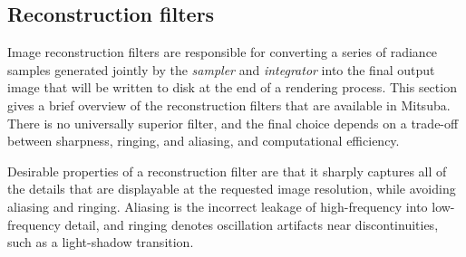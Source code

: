\newpage
\subsection{Reconstruction filters}
\label{sec:rfilters}
Image reconstruction filters are responsible for converting a series of radiance samples generated
jointly by the \emph{sampler} and \emph{integrator} into the final output image that will be written
to disk at the end of a rendering process.
This section gives a brief overview of the reconstruction filters that are available in Mitsuba.
There is no universally superior filter, and the final choice depends on a trade-off between
sharpness, ringing, and aliasing, and computational efficiency.

Desirable properties of a reconstruction filter are that it sharply captures all of the details that
are displayable at the requested image resolution, while avoiding aliasing and ringing. Aliasing is
the incorrect leakage of high-frequency into low-frequency detail, and ringing denotes oscillation artifacts
near discontinuities, such as a light-shadow transition.

